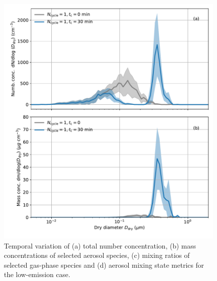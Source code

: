 \documentclass[edeposit,fullpage]{uiucthesis2009}
\begin{document}
\begin{figure}
    \centering
    \includegraphics[scale=0.5]{chap3_figs/fig_sup2.pdf}
    \caption{Temporal variation of (a) total number concentration, (b)
      mass concentrations of selected aerosol species, (c) mixing
      ratios of selected gas-phase species and (d) aerosol mixing
      state metrics for the low-emission case.}
    \label{fig:sup2}
\end{figure}
\end{document}
